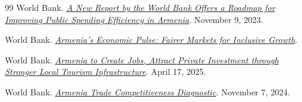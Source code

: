 \documentclass[12pt,a4paper]{report}
\begin{document}
\begin{thebibliography}{99}
World Bank.
\href{https://www.worldbank.org/en/news/press-release/2023/11/09/a-new-report-by-the-world-bank-offers-a-roadmap-for-improving-public-spending-efficiency-in-armenia}{\textit{A New Report by the World Bank Offers a Roadmap for Improving Public Spending Efficiency in Armenia}}.
November 9, 2023.

World Bank.
\href{https://www.worldbank.org/en/country/armenia/publication/armenia-economic-pulse-fairer-markets-for-inclusive-growth}{\textit{Armenia's Economic Pulse: Fairer Markets for Inclusive Growth}}.

World Bank.
\href{https://www.worldbank.org/en/news/press-release/2025/04/17/armenia-to-create-jobs-attract-private-investment-through-stronger-local-tourism-infrastructure}{\textit{Armenia to Create Jobs, Attract Private Investment through Stronger Local Tourism Infrastructure}}.
April 17, 2025.

World Bank.
\href{https://www.worldbank.org/en/news/factsheet/2024/11/07/armenia-trade-competitiveness-diagnostic}{\textit{Armenia Trade Competitiveness Diagnostic}}.
November 7, 2024.

\end{thebibliography}
\end{document}
